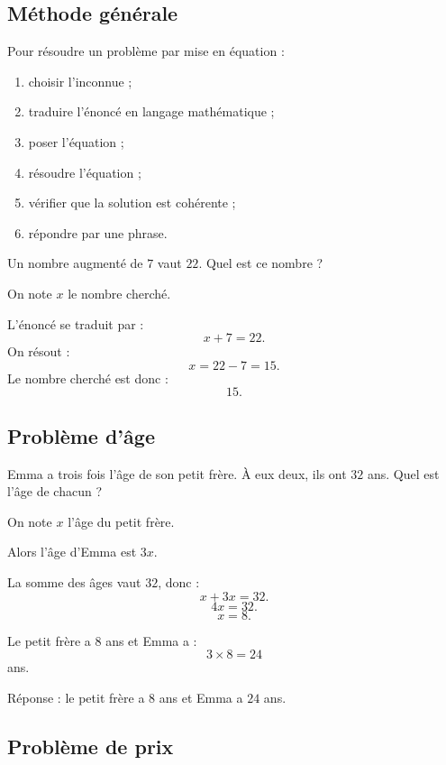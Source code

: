 \documentclass[11pt,a4paper]{article}
\newcommand{\encadre}[1]{\boxed{\displaystyle #1}}
\begin{document}
\subsection{Méthode générale}

\begin{methode}
Pour résoudre un problème par mise en équation :
\begin{enumerate}
  \item choisir l'inconnue ;
  \item traduire l'énoncé en langage mathématique ;
  \item poser l'équation ;
  \item résoudre l'équation ;
  \item vérifier que la solution est cohérente ;
  \item répondre par une phrase.
\end{enumerate}
\end{methode}

\begin{exemple}
Un nombre augmenté de $7$ vaut $22$. Quel est ce nombre ?

On note $x$ le nombre cherché.

L'énoncé se traduit par :
\[
x+7=22.
\]
On résout :
\[
x=22-7=15.
\]
Le nombre cherché est donc :
\[
\encadre{15}.
\]
\end{exemple}

\subsection{Problème d'âge}

\begin{exemple}
Emma a trois fois l'âge de son petit frère. À eux deux, ils ont $32$ ans. Quel est l'âge de chacun ?

On note $x$ l'âge du petit frère.

Alors l'âge d'Emma est $3x$.

La somme des âges vaut $32$, donc :
\[
x+3x=32.
\]
\[
4x=32.
\]
\[
x=8.
\]

Le petit frère a $8$ ans et Emma a :
\[
3\times8=24
\]
ans.

Réponse : le petit frère a $8$ ans et Emma a $24$ ans.
\end{exemple}

\subsection{Problème de prix}
\end{document}
